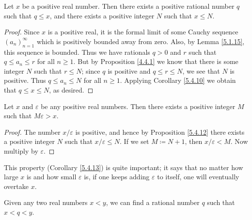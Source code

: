 \begin{proposition}\label{5.4.12}
    Let \(x\) be a positive real number.
    Then there exists a positive rational number \(q\) such that \(q \leq x\), and there exists a positive integer \(N\) such that \(x \leq N\).
\end{proposition}

\begin{proof}
    Since \(x\) is a positive real, it is the formal limit of some Cauchy sequence \((a_n)_{n = 1}^{\infty}\) which is positively bounded away from zero.
    Also, by Lemma \ref{5.1.15}, this sequence is bounded.
    Thus we have rationals \(q > 0\) and \(r\) such that \(q \leq a_n \leq r\) for all \(n \geq 1\).
    But by Proposition \ref{4.4.1} we know that there is some integer \(N\) such that \(r \leq N\);
    since \(q\) is positive and \(q \leq r \leq N\), we see that \(N\) is positive.
    Thus \(q \leq a_n \leq N\) for all \(n \geq 1\).
    Applying Corollary \ref{5.4.10} we obtain that \(q \leq x \leq N\), as desired.
\end{proof}

\begin{corollary}\label{5.4.13}
    Let \(x\) and \(\varepsilon\) be any positive real numbers.
    Then there exists a positive integer \(M\) such that \(M\varepsilon > x\).
\end{corollary}

\begin{proof}
    The number \(x / \varepsilon\) is positive, and hence by Proposition \ref{5.4.12} there exists a positive integer \(N\) such that \(x / \varepsilon \leq N\).
    If we set \(M \coloneqq N + 1\), then \(x / \varepsilon < M\).
    Now multiply by \(\varepsilon\).
\end{proof}

\begin{note}
    This property (Corollary \ref{5.4.13}) is quite important;
    it says that no matter how large \(x\) is and how small \(\varepsilon\) is, if one keeps adding \(\varepsilon\) to itself, one will eventually overtake \(x\).
\end{note}

\begin{proposition}\label{5.4.14}
    Given any two real numbers \(x < y\), we can find a rational number \(q\) such that \(x < q < y\).
\end{proposition}

